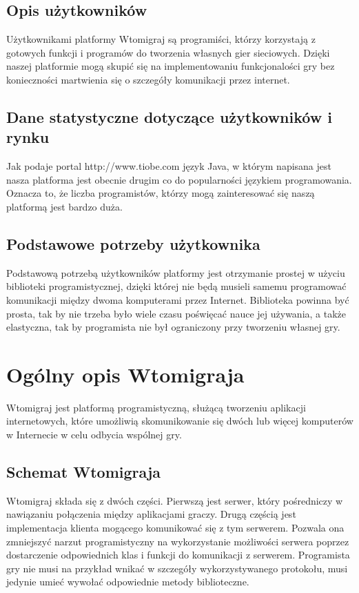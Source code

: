 \documentclass[a4paper, 12pt]{article}
\begin{document}
\subsection[Opis użytkowników]{Opis użytkowników}
Użytkownikami platformy Wtomigraj są programiści, którzy korzystają z gotowych funkcji i programów do tworzenia własnych gier sieciowych. Dzięki naszej platformie mogą skupić się na implementowaniu funkcjonalości gry bez konieczności martwienia się o szczegóły komunikacji przez internet. 

\subsection[Dane statystyczne dotyczące użytkowników i rynku]{Dane statystyczne dotyczące użytkowników i rynku}
Jak podaje portal http://www.tiobe.com język Java, w którym napisana jest nasza platforma jest obecnie drugim co do popularności językiem programowania. Oznacza to, że liczba programistów, którzy mogą zainteresować się naszą platformą jest bardzo duża.

\subsection[Podstawowe potrzeby użytkownika]{Podstawowe potrzeby użytkownika}
Podstawową potrzebą użytkowników platformy jest otrzymanie prostej w użyciu biblioteki programistycznej, dzięki której nie będą musieli samemu programować komunikacji między dwoma komputerami przez Internet. Biblioteka powinna być prosta, tak by nie trzeba było wiele czasu poświęcać nauce jej używania, a także elastyczna, tak by programista nie był ograniczony przy tworzeniu własnej gry.

\section[Ogólny opis Wtomigraja]{Ogólny opis Wtomigraja}
Wtomigraj jest platformą programistyczną, służącą tworzeniu aplikacji internetowych, które umożliwią skomunikowanie się dwóch lub więcej komputerów w Internecie w celu odbycia wspólnej gry.

\subsection[Schemat Wtomigraja]{Schemat Wtomigraja}
Wtomigraj składa się z dwóch części. Pierwszą jest serwer, który pośredniczy w nawiązaniu połączenia między aplikacjami graczy. Drugą częścią jest implementacja klienta mogącego komunikować się z tym serwerem. Pozwala ona zmniejszyć narzut programistyczny na wykorzystanie możliwości serwera poprzez dostarczenie odpowiednich klas i funkcji do komunikacji z serwerem. Programista gry nie musi na przykład wnikać w szczegóły wykorzystywanego protokołu, musi jedynie umieć wywołać odpowiednie metody biblioteczne. 
\end{document}
